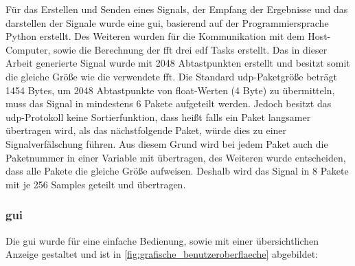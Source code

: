 \documentclass[../EDF Master Thesis.tex]{subfiles}
\begin{document}
        Für das Erstellen und Senden eines Signals, der Empfang der Ergebnisse und das darstellen der Signale wurde eine \ac{gui}, basierend auf der Programmiersprache Python erstellt.
        Des Weiteren wurden für die Kommunikation mit dem Host-Computer, sowie die Berechnung der \ac{fft} drei \ac{edf} Tasks erstellt.
        Das in dieser Arbeit generierte Signal wurde mit 2048 Abtastpunkten erstellt und besitzt somit die gleiche Größe wie die verwendete \ac{fft}.
        Die Standard \ac{udp}-Paketgröße beträgt 1454 Bytes, um 2048 Abtastpunkte von float-Werten (4 Byte) zu übermitteln, muss das Signal in mindestens 6 Pakete aufgeteilt werden.
        Jedoch besitzt das \ac{udp}-Protokoll keine Sortierfunktion, dass heißt falls ein Paket langsamer übertragen wird, als das nächstfolgende Paket, würde dies zu einer Signalverfälschung führen.
        Aus diesem Grund wird bei jedem Paket auch die Paketnummer in einer Variable mit übertragen, des Weiteren wurde entscheiden, dass alle Pakete die gleiche Größe aufweisen.
        Deshalb wird das Signal in 8 Pakete mit je 256 Samples geteilt und übertragen.

        \clearpage
        \subsubsection{\ac{gui}}
            Die \ac{gui} wurde für eine einfache Bedienung, sowie mit einer übersichtlichen Anzeige gestaltet und ist in \autoref{fig:grafische_benutzeroberflaeche} abgebildet:
\end{document}
